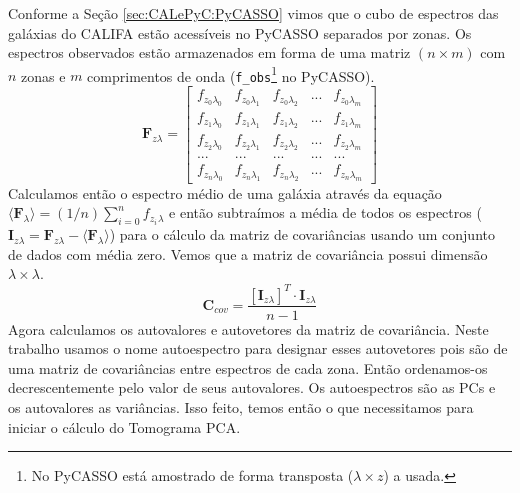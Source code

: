 Conforme a Seção \ref{sec:CALePyC:PyCASSO} vimos que o cubo de espectros das
galáxias do CALIFA estão acessíveis no PyCASSO separados por zonas. Os espectros
observados estão armazenados em forma de uma matriz $(n \times m)$ com $n$ zonas
e $m$ comprimentos de onda (\texttt{f\_obs}\footnote{No PyCASSO está amostrado
de forma transposta ($\lambda \times z$) a usada.} no PyCASSO). 
\begin{equation}
    \label{eq:PCA:fluxMatrix}
    \textbf{F}{}_{z \lambda} = \left[
    \begin{array}{ccccc}
        f_{z_0 \lambda_0} & f_{z_0 \lambda_1} & f_{z_0 \lambda_2} & ... & f_{z_0 \lambda_m} \\
        f_{z_1 \lambda_0} & f_{z_1 \lambda_1} & f_{z_1 \lambda_2} & ... & f_{z_1 \lambda_m} \\
        f_{z_2 \lambda_0} & f_{z_2 \lambda_1} & f_{z_2 \lambda_2} & ... & f_{z_2 \lambda_m} \\
        ...               & ...               & ...               & ... & ...               \\
        f_{z_n \lambda_0} & f_{z_n \lambda_1} & f_{z_n \lambda_2} & ... & f_{z_n \lambda_m} 
    \end{array} 
    \right]
\end{equation}
Calculamos então o espectro médio de uma galáxia através da equação $\langle
\textbf{F}{}_\lambda \rangle = (1 / n) \sum_{i=0}^{n} f_{z_i}{}_{\lambda}$ e
então subtraímos a média de todos os espectros ($\textbf{I}{}_{z \lambda} =
\textbf{F}{}_{z \lambda} - \langle \textbf{F}{}_\lambda \rangle$) para o cálculo
da matriz de covariâncias usando um conjunto de dados com média zero. Vemos que
a matriz de covariância possui dimensão $\lambda \times \lambda$. 
\begin{equation}
	\label{eq:PCA:covMatrix}
	\mathbf{C}{}_{cov} = \frac{[\mathbf{I}{}_{z \lambda}]^T \cdot \mathbf{I}{}_{z
	\lambda}}{n - 1}
\end{equation}
Agora calculamos os autovalores e autovetores da matriz de covariância. Neste
trabalho usamos o nome autoespectro para designar esses autovetores pois são de
uma matriz de covariâncias entre espectros de cada zona. Então ordenamos-os
decrescentemente pelo valor de seus autovalores. Os autoespectros são as PCs e
os autovalores as variâncias. Isso feito, temos então o que necessitamos para
iniciar o cálculo do Tomograma PCA.
